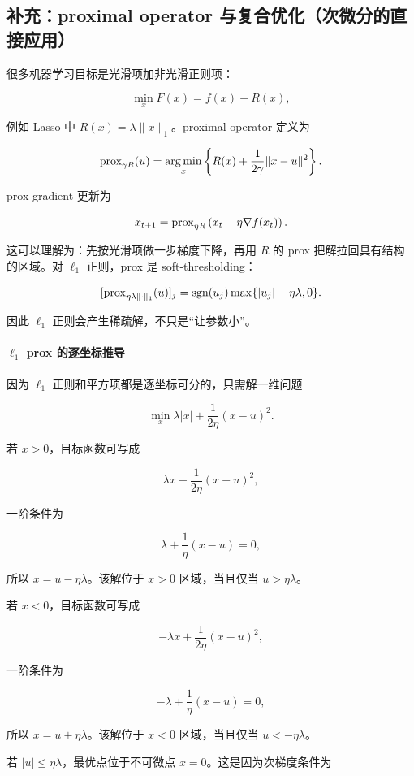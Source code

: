 \documentclass[11pt]{ctexart}
\begin{document}
\subsection{补充：proximal operator 与复合优化（次微分的直接应用）}


很多机器学习目标是光滑项加非光滑正则项：

\[
  \min_x F(x)=f(x)+R(x),
\]

例如 Lasso 中 \(R(x)=\lambda\|x\|_1\)。proximal operator 定义为

\[
  \operatorname{prox}_{\gamma R}(u)
  =
  \operatorname*{arg\,min}_x
  \left\{
    R(x)+\frac{1}{2\gamma}\|x-u\|^2
  \right\}.
\]

prox-gradient 更新为

\[
  x_{t+1}
  =
  \operatorname{prox}_{\eta R}
  \left(x_t-\eta\nabla f(x_t)\right).
\]

这可以理解为：先按光滑项做一步梯度下降，再用 \(R\) 的 prox 把解拉回具有结构的区域。对 \(\ell_1\) 正则，prox 是 soft-thresholding：

\[
  [\operatorname{prox}_{\eta\lambda\|\cdot\|_1}(u)]_j
  =
  \operatorname{sgn}(u_j)\max\{|u_j|-\eta\lambda,0\}.
\]

因此 \(\ell_1\) 正则会产生稀疏解，不只是“让参数小”。

\paragraph{\(\ell_1\) prox 的逐坐标推导}

因为 \(\ell_1\) 正则和平方项都是逐坐标可分的，只需解一维问题

\[
  \min_x
  \lambda |x|
  +
  \frac{1}{2\eta}(x-u)^2.
\]

若 \(x>0\)，目标函数可写成

\[
  \lambda x+\frac{1}{2\eta}(x-u)^2,
\]

一阶条件为

\[
  \lambda+\frac{1}{\eta}(x-u)=0,
\]

所以 \(x=u-\eta\lambda\)。该解位于 \(x>0\) 区域，当且仅当 \(u>\eta\lambda\)。

若 \(x<0\)，目标函数可写成

\[
  -\lambda x+\frac{1}{2\eta}(x-u)^2,
\]

一阶条件为

\[
  -\lambda+\frac{1}{\eta}(x-u)=0,
\]

所以 \(x=u+\eta\lambda\)。该解位于 \(x<0\) 区域，当且仅当 \(u<-\eta\lambda\)。

若 \(|u|\le\eta\lambda\)，最优点位于不可微点 \(x=0\)。这是因为次梯度条件为
\end{document}
